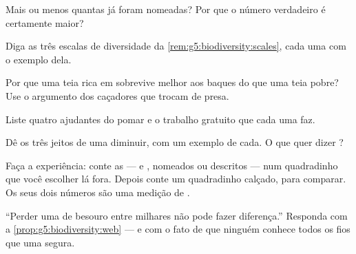 \begin{exercise}[$\star$]\label{exo:g5:biodiversity:3}
Mais ou menos quantas  já foram nomeadas? Por que o número
verdadeiro é certamente maior?
\end{exercise}

\begin{exercise}[$\star$]\label{exo:g5:biodiversity:4}
Diga as três escalas de diversidade da
\cref{rem:g5:biodiversity:scales}, cada uma com o exemplo dela.
\end{exercise}

\begin{exercise}[$\star$]\label{exo:g5:biodiversity:5}
Por que uma teia rica em  sobrevive melhor aos baques do que
uma teia pobre? Use o argumento dos caçadores que trocam de presa.
\end{exercise}

\begin{exercise}[$\star$]\label{exo:g5:biodiversity:6}
Liste quatro  ajudantes do pomar e o trabalho gratuito que
cada uma faz.
\end{exercise}

\begin{exercise}[$\star$]\label{exo:g5:biodiversity:7}
Dê os três jeitos de uma  diminuir, com um exemplo de cada. O
que quer dizer \emph{}?
\end{exercise}

\begin{exercise}[$\star$]\label{exo:g5:biodiversity:8}
Faça a experiência: conte as  ---  e ,
nomeados ou descritos --- num quadradinho que você escolher lá fora.
Depois conte um quadradinho calçado, para comparar. Os seus dois
números são uma medição de .
\end{exercise}

\begin{exercise}[$\star\star$]\label{exo:g5:biodiversity:9}
``Perder uma  de besouro entre milhares não pode fazer
diferença.'' Responda com a \cref{prop:g5:biodiversity:web} --- e com
o fato de que ninguém conhece todos os fios que uma  segura.
\end{exercise}

